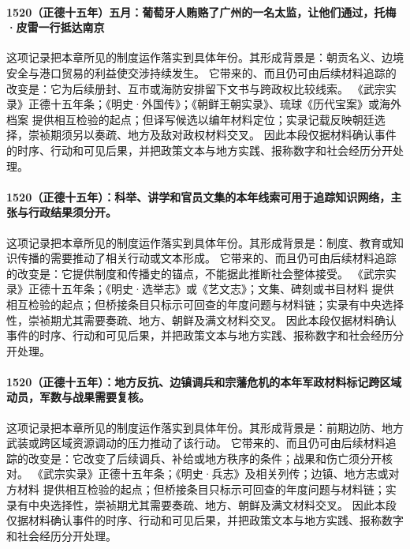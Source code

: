 \paragraph{1520（正德十五年）五月：葡萄牙人贿赂了广州的一名太监，让他们通过，托梅·皮雷一行抵达南京} 这项记录把本章所见的制度运作落实到具体年份。其形成背景是：朝贡名义、边境安全与港口贸易的利益使交涉持续发生。 它带来的、而且仍可由后续材料追踪的改变是：它为后续册封、互市或海防安排留下文书与跨政权比较线索。 《武宗实录》正德十五年条；《明史·外国传》；《朝鲜王朝实录》、琉球《历代宝案》或海外档案 提供相互检验的起点；但译写候选以编年材料定位；实录记载反映朝廷选择，崇祯期须另以奏疏、地方及敌对政权材料交叉。 因此本段仅据材料确认事件的时序、行动和可见后果，并把政策文本与地方实践、报称数字和社会经历分开处理。

\paragraph{1520（正德十五年）：科举、讲学和官员文集的本年线索可用于追踪知识网络，主张与行政结果须分开。} 这项记录把本章所见的制度运作落实到具体年份。其形成背景是：制度、教育或知识传播的需要推动了相关行动或文本形成。 它带来的、而且仍可由后续材料追踪的改变是：它提供制度和传播史的锚点，不能据此推断社会整体接受。 《武宗实录》正德十五年条；《明史·选举志》或《艺文志》；文集、碑刻或书目材料 提供相互检验的起点；但桥接条目只标示可回查的年度问题与材料链；实录有中央选择性，崇祯期尤其需要奏疏、地方、朝鲜及满文材料交叉。 因此本段仅据材料确认事件的时序、行动和可见后果，并把政策文本与地方实践、报称数字和社会经历分开处理。

\paragraph{1520（正德十五年）：地方反抗、边镇调兵和宗藩危机的本年军政材料标记跨区域动员，军数与战果需要复核。} 这项记录把本章所见的制度运作落实到具体年份。其形成背景是：前期边防、地方武装或跨区域资源调动的压力推动了该行动。 它带来的、而且仍可由后续材料追踪的改变是：它改变了后续调兵、补给或地方秩序的条件；战果和伤亡须分开核对。 《武宗实录》正德十五年条；《明史·兵志》及相关列传；边镇、地方志或对方材料 提供相互检验的起点；但桥接条目只标示可回查的年度问题与材料链；实录有中央选择性，崇祯期尤其需要奏疏、地方、朝鲜及满文材料交叉。 因此本段仅据材料确认事件的时序、行动和可见后果，并把政策文本与地方实践、报称数字和社会经历分开处理。

